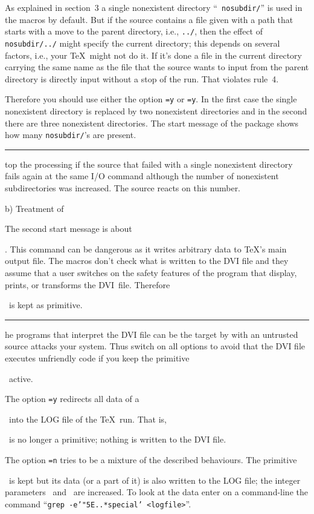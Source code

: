 As explained in section~3 a single nonexistent directory ``{\tt
nosubdir/}'' is used in the macros by default. But if the source
contains a file given with a path that starts with a move to the
parent directory, i.e., {\tt../}, then the effect of {\tt
nosubdir/../} might specify the current directory; this depends on
several factors, i.e., your \TeX\ might not do it. If it's done a file
in the current directory carrying the same name as the file that the
source wants to input from the parent directory is directly input
without a stop of the run. That violates rule~4.

Therefore you should use either the option
{\tt\cs\let\cs\twonosubdirs=y} or {\tt\cs\let\cs\threenosubdirs=y}. In
the first case the single nonexistent directory is replaced by two
nonexistent directories and in the second there are three
nonexistent directories. The start message of the package shows how
many {\tt nosubdir/}'s are present.

 \rule9 Stop the processing if the source that failed with a single
nonexistent directory fails again at the same I/O command although the
number of nonexistent subdirectories was increased. The source reacts
on this number.


\beginsection \rm b) Treatment of \cs\special

The second start message is about \cs\special. This command can be
dangerous as it writes arbitrary data to \TeX's main output file. The
macros don't check what is written to the DVI file and they assume
that a user switches on the safety features of the program that
display, prints, or transforms the DVI~file. Therefore \cs\special\ is
kept as primitive.

 \rule{10} The programs that interpret the DVI file can be the target
by with an untrusted source attacks your system. Thus switch on all
options to avoid that the DVI file executes unfriendly code if you
keep the primitive \cs\special\ active.

The option {\tt\cs\let\cs\disablespecial=y} redirects all data of
a \cs\special\ into the LOG file of the \TeX\ run. That
is, \cs\special\ is no longer a primitive; nothing is written to the
DVI file.

The option {\tt\cs\let\cs\disablespecial=n} tries to be a mixture of
the described behaviours. The primitive \cs\special\ is kept but its
data (or a part of it) is also written to the LOG file; the integer
parameters \cs\showboxdepth\ and \cs\showboxbreadth\ are increased. To
look at the data enter on a command-line the command ``{\tt grep
-e'\char"5E\bs.\bs.*\bs\bs special' <logfile>}''.



